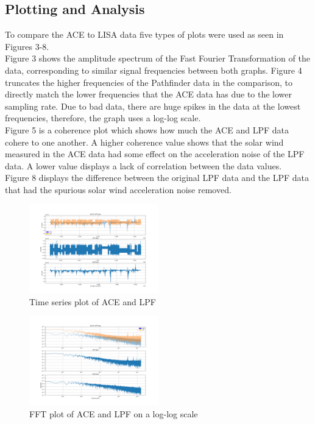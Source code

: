 \documentclass[%
 reprint,
 amsmath,amssymb,
 aps,
]{revtex4-2}
\begin{document}
\subsection{Plotting and Analysis}
To compare the ACE to LISA data five types of plots were used as seen in Figures 3-8. \\
Figure 3 shows the amplitude spectrum of the Fast Fourier Transformation of the data, corresponding to similar signal frequencies between both graphs. Figure 4 truncates the higher frequencies of the Pathfinder data in the comparison, to directly match the lower frequencies that the ACE data has due to the lower sampling rate. Due to bad data, there are huge spikes in the data at the lowest frequencies, therefore, the graph uses a log-log scale.\\
Figure 5 is a coherence plot which shows how much the ACE and LPF data cohere to one another. A higher coherence value shows that the solar wind measured in the ACE data had some effect on the acceleration noise of the LPF data. A lower value displays a lack of correlation between the data values.\\
Figure 8 displays the difference between the original LPF data and the LPF data that had the spurious solar wind acceleration noise removed.\\
\begin{figure}[htbp]
\centerline{\includegraphics[width=0.5\textwidth]{TimeDomain_Comparison_ACEvLPF-1.png}}
\caption{Time series plot of ACE and LPF}
\label{fig}
\end{figure}
\begin{figure}[htbp]
\centerline{\includegraphics[width=0.5\textwidth]{ACE_and_LPF_loglog-1.png}}
\caption{FFT plot of ACE and LPF on a log-log scale}
\label{fig}
\end{figure}
\end{document}
